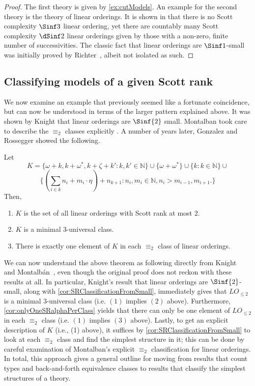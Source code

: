 \documentclass[10pt,a4paper]{amsart}
\renewcommand{\-}{\text{-}}
\begin{document}
\begin{proof}
  The first theory is given by \cref{ex:cutModels}. An example for the second theory is the theory of linear orderings.
It is shown in \cite{GR24} that there is no Scott complexity $\Sinf3$ linear ordering, yet there are countably many Scott complexity $\dSinf2$ linear orderings given by those with a non-zero, finite number of successivities.
The classic fact that linear orderings are $\Sinf1$-small was initially proved by Richter~\cite{richter1981}, albeit not isolated as such.
\end{proof}

\subsection{Classifying models of a given Scott rank}

We now examine an example that previously seemed like a fortunate coincidence, but can now be understood in terms of the larger pattern explained above.
It was shown by Knight \cite{Kni86} that linear orderings are $\Sinf{2}$ small.
Montalban took care to describe the $\equiv_2$ classes explicitly \cite[Section 4]{McountingBF}.
A number of years later, Gonzalez and Rossegger showed the following.
\begin{theorem}
Let
\[K=\{\omega+k, k+\omega^*, k+\zeta+k':k,k'\in\mathbb N\}\cup\{\omega+\omega^*\}\cup\{k:k\in\mathbb N\}\cup\]
\[\{(\sum_{i\in k} n_i + m_i\cdot\eta )+n_{k+1}:n_i,m_i\in\mathbb N,
n_i>m_{i-1},m_{i+1}.\}\]
Then,
\begin{enumerate}
	\item $K$ is the set of all linear orderings with Scott rank at most $2$.
	\item $K$ is a minimal $3$-universal class.
	\item There is exactly one element of $K$ in each $\equiv_2$ class of linear orderings.
\end{enumerate}
\end{theorem}
We can now understand the above theorem as following directly from Knight~\cite{Kni86} and Montalbán~\cite[Section 4]{McountingBF}, even though the original proof does not reckon with these results at all.
In particular, Knight's result that linear orderings are $\Sinf{2}$-small, along with \cref{cor:SRClassificationFromSmall}, immediately gives that $LO_{\leq2}$ is a minimal $3$-universal class (i.e. $(1)$ implies $(2)$ above).
Furthermore, \cref{cor:onlyOneSRalphaPerClass} yields that there can only be one element of $LO_{\leq2}$ in each $\equiv_2$ class (i.e. $(1)$ implies $(3)$ above).
Lastly, to get an explicit description of $K$ (i.e., (1) above), it suffices by \cref{cor:SRClassificationFromSmall} to look at each $\equiv_2$ class and find the simplest structure in it; this can be done by careful examination of Montalban's explicit $\equiv_2$ classification for linear orderings.
In total, this approach gives a general outline for moving from results that count types and back-and-forth equivalence classes to results that classify the simplest structures of a theory.
\end{document}
